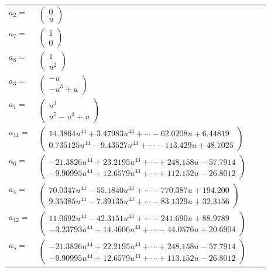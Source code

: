 \documentclass[1p]{elsarticle_modified}
\theoremstyle{definition}
\begin{document}
\begin{tabular}{m{7pt} m{180pt} m{7pt} m{180pt} }
\flushright $a_{2}=$&$\begin{pmatrix}0\\u\end{pmatrix}$ \\
\flushright $a_{7}=$&$\begin{pmatrix}1\\0\end{pmatrix}$ \\
\flushright $a_{8}=$&$\begin{pmatrix}1\\u^2\end{pmatrix}$ \\
\flushright $a_{3}=$&$\begin{pmatrix}- u\\- u^3+u\end{pmatrix}$ \\
\flushright $a_{1}=$&$\begin{pmatrix}u^3\\u^5- u^3+u\end{pmatrix}$ \\
\flushright $a_{11}=$&$\begin{pmatrix}14.3864 u^{44}+3.47983 u^{43}+\cdots-62.0208 u+6.44819\\0.735125 u^{44}-9.43527 u^{43}+\cdots-113.429 u+48.7025\end{pmatrix}$ \\
\flushright $a_{6}=$&$\begin{pmatrix}-21.3826 u^{44}+23.2195 u^{43}+\cdots+248.158 u-57.7914\\-9.90995 u^{44}+12.6579 u^{43}+\cdots+112.152 u-26.8012\end{pmatrix}$ \\
\flushright $a_{4}=$&$\begin{pmatrix}70.0347 u^{44}-55.1840 u^{43}+\cdots-770.387 u+194.200\\9.35385 u^{44}-7.39135 u^{43}+\cdots-83.1329 u+32.3156\end{pmatrix}$ \\
\flushright $a_{12}=$&$\begin{pmatrix}11.0692 u^{44}-42.3151 u^{43}+\cdots-241.690 u+88.9789\\-3.23793 u^{44}-14.4606 u^{43}+\cdots-44.0576 u+20.6904\end{pmatrix}$ \\
\flushright $a_{5}=$&$\begin{pmatrix}-21.3826 u^{44}+22.2195 u^{43}+\cdots+248.158 u-57.7914\\-9.90995 u^{44}+12.6579 u^{43}+\cdots+113.152 u-26.8012\end{pmatrix}$ \\

\end{tabular}
\end{document}

